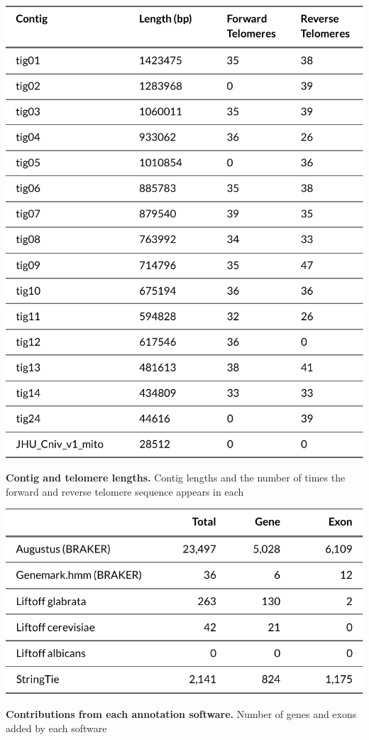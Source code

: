 \begin{table}[!ht]
\centering
\includegraphics[width = 1\linewidth,keepaspectratio]{figure/telotable.pdf}
\caption[Contig and telomere lengths]{{\bf Contig and telomere lengths.} Contig lengths and the number of times the forward and reverse telomere sequence appears in each }
\label{tab:telotable}
\end{table}

\begin{table}[!ht]
\centering
\includegraphics[width = 1\linewidth,keepaspectratio]{figure/genecounttable.pdf}
\caption[Contributions from each annotation software]{{\bf Contributions from each annotation software.} Number of genes and exons added by each software }
\label{tab:telotable}
\end{table}

